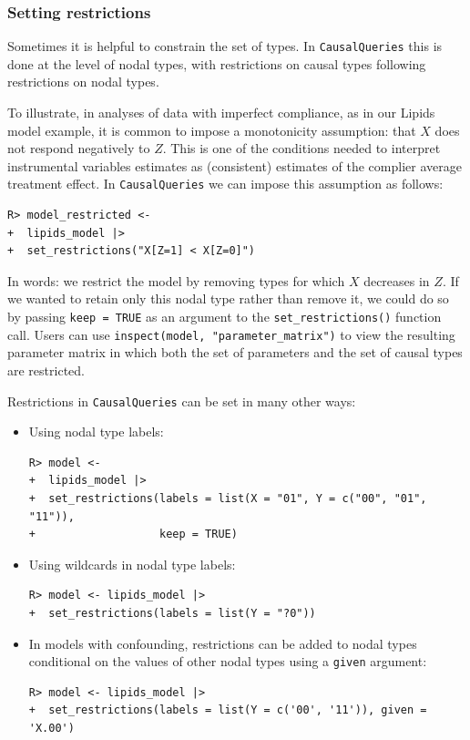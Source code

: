 \documentclass[
  11pt,
  article]{jss}
\begin{document}
\subsubsection{Setting restrictions}\label{restrictions}

Sometimes it is helpful to constrain the set of types. In
\texttt{CausalQueries} this is done at the level of nodal types, with
restrictions on causal types following restrictions on nodal types.

To illustrate, in analyses of data with imperfect compliance, as in our
Lipids model example, it is common to impose a monotonicity assumption:
that \(X\) does not respond negatively to \(Z\). This is one of the
conditions needed to interpret instrumental variables estimates as
(consistent) estimates of the complier average treatment effect. In
\texttt{CausalQueries} we can impose this assumption as follows:

\begin{verbatim}
R> model_restricted <- 
+  lipids_model |> 
+  set_restrictions("X[Z=1] < X[Z=0]")
\end{verbatim}

In words: we restrict the model by removing types for which \(X\)
decreases in \(Z\). If we wanted to retain only this nodal type rather
than remove it, we could do so by passing \texttt{keep\ =\ TRUE} as an
argument to the \texttt{set\_restrictions()} function call. Users can
use \texttt{inspect(model,\ "parameter\_matrix")} to view the resulting
parameter matrix in which both the set of parameters and the set of
causal types are restricted.

Restrictions in \texttt{CausalQueries} can be set in many other ways:

\begin{itemize}
\item
  Using nodal type labels:

\begin{verbatim}
R> model <- 
+  lipids_model |>
+  set_restrictions(labels = list(X = "01", Y = c("00", "01", "11")), 
+                   keep = TRUE)
\end{verbatim}
\item
  Using wildcards in nodal type labels:

\begin{verbatim}
R> model <- lipids_model |>
+  set_restrictions(labels = list(Y = "?0"))
\end{verbatim}
\item
  In models with confounding, restrictions can be added to nodal types
  conditional on the values of other nodal types using a \texttt{given}
  argument:

\begin{verbatim}
R> model <- lipids_model |>
+  set_restrictions(labels = list(Y = c('00', '11')), given = 'X.00')
\end{verbatim}
\end{itemize}
\end{document}
